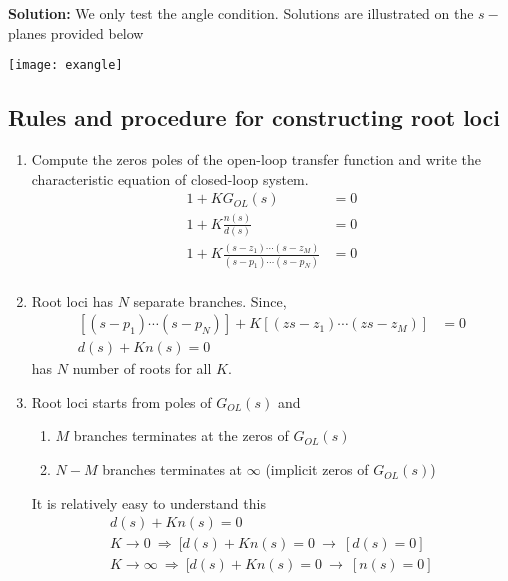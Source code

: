 \documentclass[twoside]{article}
\begin{document}
 \textbf{Solution:}  We only test the angle
 condition. Solutions are illustrated on the $s-$planes
provided below

 \begin{center}
\begin{minipage}[h]{\linewidth}
    \begin{center}
      \texttt{[image: exangle]}
    \end{center}
\end{minipage}
\end{center}

\subsection{Rules and procedure for constructing root loci}

\begin{enumerate} 

\item Compute the zeros poles of the open-loop 
transfer function and write the characteristic equation
of closed-loop system.
%
\begin{align*}
1 + K G_{OL}(s)  &= 0 \\
1 + K \frac{n(s)}{d(s)} &= 0 \\
1 + K \frac{(s- z_1) \cdots (s- z_M)}{(s - p_1) \cdots (s - p_N)} &= 0 \\
\end{align*}
%

\item Root loci has $N$ separate branches. Since,
%
\begin{align*}
\left[ (s - p_1) \cdots (s - p_N) \right] + K \left[ (zs- z_1) \cdots (zs- z_M) \right]  &= 0 \\
d(s) + K n(s) = 0
\end{align*}
%
has $N$ number of roots for all $K$.

\item Root loci starts from poles of $G_{OL}(s)$ and 
%
\begin{enumerate} 
   \item $M$ branches terminates at the zeros of $G_{OL}(s)$
   \item $N-M$ branches terminates at $\infty$ (implicit zeros of $G_{OL}(s)$)
\end{enumerate}

It is relatively easy to understand this 
%
\begin{align*}
d(s) + K n(s) = 0 
\\
K \to 0 \ \Rightarrow \ [d(s) + K n(s) = 0 \ \to \ [d(s) = 0]
\\
K \to \infty \ \Rightarrow \ [d(s) + K n(s) = 0 \ \to  \ [n(s) = 0]
\end{align*}


\end{enumerate}
\end{document}
